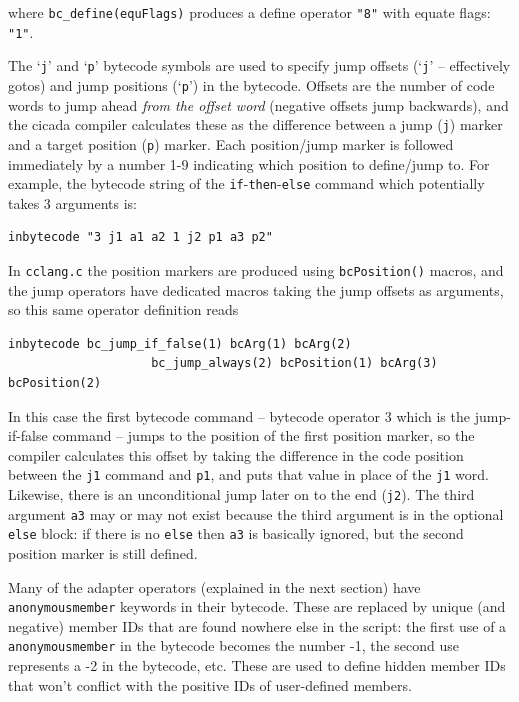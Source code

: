 \documentclass{article}
\newenvironment{code}{
       \begin{list}{}{
               \setlength{\leftmargin}{.4in}
               \setlength{\rightmargin}{0in}
               \setlength{\topsep}{.2in}
       }
       \small
       \item[] }
       { \end{list}   }
\begin{document}
\noindent where \verb#bc_define(equFlags)# produces a define operator \verb#"8"# with equate flags:  \verb#"1"#.

The `\verb#j#' and `\verb#p#' bytecode symbols are used to specify jump offsets (`\verb#j#' -- effectively gotos) and jump positions (`\verb#p#') in the bytecode.  Offsets are the number of code words to jump ahead \emph{from the offset word} (negative offsets jump backwards), and the cicada compiler calculates these as the difference between a jump (\verb#j#) marker and a target position (\verb#p#) marker.  Each position/jump marker is followed immediately by a number 1-9 indicating which position to define/jump to.  For example, the bytecode string of the \verb#if#-\verb#then#-\verb#else# command which potentially takes 3 arguments is:

\begin{code} \begin{verbatim}
inbytecode "3 j1 a1 a2 1 j2 p1 a3 p2"
\end{verbatim} \end{code}

\noindent In \verb#cclang.c# the position markers are produced using \verb#bcPosition()# macros, and the jump operators have dedicated macros taking the jump offsets as arguments, so this same operator definition reads

\begin{code} \begin{verbatim}
inbytecode bc_jump_if_false(1) bcArg(1) bcArg(2)
                    bc_jump_always(2) bcPosition(1) bcArg(3) bcPosition(2)
\end{verbatim} \end{code}

\noindent In this case the first bytecode command -- bytecode operator 3 which is the jump-if-false command -- jumps to the position of the first position marker, so the compiler calculates this offset by taking the difference in the code position between the \verb#j1# command and \verb#p1#, and puts that value in place of the \verb#j1# word.  Likewise, there is an unconditional jump later on to the end (\verb#j2#).  The third argument \verb#a3# may or may not exist because the third argument is in the optional \verb#else# block:  if there is no \verb#else# then \verb#a3# is basically ignored, but the second position marker is still defined.

Many of the adapter operators (explained in the next section) have \verb#anonymousmember# keywords in their bytecode.  These are replaced by unique (and negative) member IDs that are found nowhere else in the script:  the first use of a \verb#anonymousmember# in the bytecode becomes the number -1, the second use represents a -2 in the bytecode, etc.  These are used to define hidden member IDs that won't conflict with the positive IDs of user-defined members.
\end{document}
